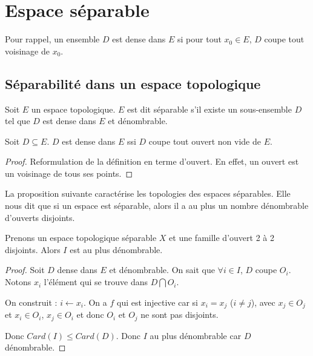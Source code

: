 \chapter{Espace séparable}

Pour rappel, un ensemble $D$ est dense dans $E$ si pour tout $x_{0} \in E$, $D$
coupe tout voisinage de $x_{0}$.

\section{Séparabilité dans un espace topologique}

\begin{definition}
	Soit $E$ un espace topologique.
	$E$ est dit séparable s'il existe un sous-ensemble $D$ tel que $D$ est dense
	dans $E$ et dénombrable.
\end{definition}

\begin{proposition}
	Soit $D \subseteq E$.
	$D$ est dense dans $E$ ssi $D$ coupe tout ouvert non vide de $E$.
\end{proposition}

\begin{proof}
	Reformulation de la définition en terme d'ouvert. En effet, un ouvert est un
	voisinage de tous ses points.
\end{proof}

La proposition suivante caractérise les topologies des espaces séparables. Elle
nous dit que si un espace est séparable, alors il a au plus un nombre
dénombrable d'ouverts disjoints.

\begin{proposition}
	Prenons un espace topologique séparable $X$ et une famille d'ouvert
	 2 à 2 disjoints. Alors $I$ est au plus dénombrable.
\end{proposition}

\begin{proof}
	Soit $D$ dense dans $E$ et dénombrable. On sait que $\forall i \in I$, $D$
	coupe $O_{i}$. Notons $x_{i}$ l'élément qui se trouve dans $D \bigcap
	O_{i}$.

	On construit  : $i \leftarrow x_{i}$. On a $f$ qui
	est injective car si $x_{i} = x_{j}$ ($i \neq j$), avec $x_{j} \in O_{j}$ et
	$x_{i} \in O_{i}$, $x_{j} \in O_{i}$ et donc $O_{i}$ et $O_{j}$ ne sont pas
	disjoints.

	Donc $Card(I) \leq Card(D)$. Donc $I$ au plus dénombrable car $D$ dénombrable.
\end{proof}

